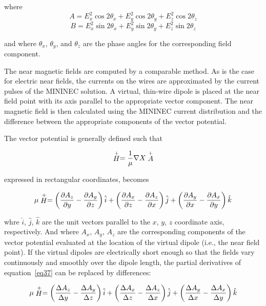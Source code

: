 \documentclass[12pt]{article}
\begin{document}
\noindent where
\[ A = E_x^2\cos 2\theta_x + E_y^2\cos 2\theta_y + E_z^2\cos 2\theta_z
\]
\[ B = E_x^2\sin 2\theta_x + E_y^2\sin 2\theta_y + E_z^2\sin 2\theta_z
\]

\noindent and where $\theta_x$, $\theta_y$, and $\theta_z$ are the phase
angles for the corresponding field component.

The near magnetic fields are computed by a comparable method. As is the
case for electric near fields, the currents on the wires are
approximated by the current pulses of the MININEC solution. A virtual,
thin-wire dipole is placed at the near field point with its axis
parallel to the appropriate vector component. The near magnetic field is
then calculated using the MININEC current distribution and the
difference between the appropriate components of the vector potential.

The vector potential is generally defined such that

\begin{equation}
\stackrel{+}{H} = \frac{1}{\mu}\nabla X\stackrel{+}{A}
\label{eq36}
\end{equation}

\noindent expressed in rectangular coordinates, becomes

\begin{equation}
\mu\stackrel{+}{H} =
\left(\frac{\partial A_z}{\partial y} - \frac{\partial A_y}{\partial z}\right)
\hat{i} +
\left(\frac{\partial A_x}{\partial z} - \frac{\partial A_z}{\partial x}\right)
\hat{j}+
\left(\frac{\partial A_y}{\partial x} - \frac{\partial A_x}{\partial y}\right)
\hat{k}
\label{eq37}
\end{equation}

whre $\hat{i}$, $\hat{j}$, $\hat{k}$ are the unit vectors parallel to
the $x$, $y$, $z$ coordinate axis, respectively. And where $A_x$, $A_y$,
$A_z$ are the corresponding components of the vector potential evaluated
at the location of the virtual dipole (i.e., the near field point). If
the virtual dipoles are electrically short enough so that the fields
vary continuously and smoothly over the dipole length, the partial
derivatives of equation~\eqref{eq37} can be replaced by differences:

\begin{equation}
\mu\stackrel{+}{H} =
\left(\frac{\Delta A_z}{\Delta y} - \frac{\Delta A_y}{\Delta z}\right)
\hat{i} +
\left(\frac{\Delta A_x}{\Delta z} - \frac{\Delta A_z}{\Delta x}\right)
\hat{j}+
\left(\frac{\Delta A_y}{\Delta x} - \frac{\Delta A_x}{\Delta y}\right)
\hat{k}
\label{eq38}
\end{equation}
\end{document}
